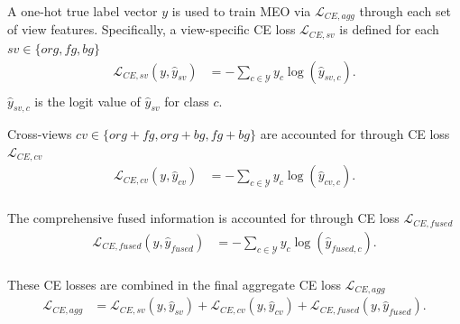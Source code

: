 A one-hot true label vector $y$ is used to train MEO via $\mathcal{L}_{CE,agg}$ through each set of view features. Specifically, a view-specific CE loss $\mathcal{L}_{CE,sv}$ is defined for each $sv \in \{org, fg, bg\}$
\begin{equation}
\begin{aligned}
    \mathcal{L}_{CE,sv}(y, \hat{y}_{sv}) & = -\sum_{c \in \mathcal{Y}} y_{c} \log(\hat{y}_{sv,c}). \\
\end{aligned}
\end{equation}
$\hat{y}_{sv,c}$ is the logit value of $\hat{y}_{sv}$ for class $c$.

Cross-views $cv \in \{org+fg, org+bg, fg+bg\}$ are accounted for through CE loss $\mathcal{L}_{CE,cv}$
\begin{equation}
\begin{aligned}
    \mathcal{L}_{CE,cv}(y, \hat{y}_{cv}) & = -\sum_{c \in \mathcal{Y}} y_{c} \log(\hat{y}_{cv,c}). \\
\end{aligned}
\end{equation}

The comprehensive fused information is accounted for through CE loss $\mathcal{L}_{CE,fused}$
\begin{equation}
\begin{aligned}
    \mathcal{L}_{CE,fused}(y, \hat{y}_{fused}) & = -\sum_{c \in \mathcal{Y}} y_{c} \log(\hat{y}_{fused,c}). \\
\end{aligned}
\end{equation}

These CE losses are combined in the final aggregate CE loss $\mathcal{L}_{CE,agg}$
\begin{equation}
\begin{aligned}
    \mathcal{L}_{CE,agg} & = \mathcal{L}_{CE,sv} (y, \hat{y}_{sv}) + \mathcal{L}_{CE,cv} (y, \hat{y}_{cv}) + \mathcal{L}_{CE,fused} (y, \hat{y}_{fused}).
\end{aligned}
\end{equation}

